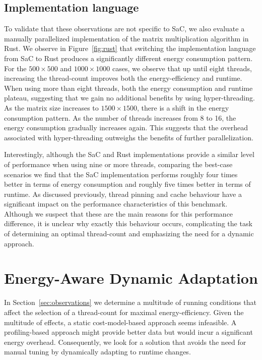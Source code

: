 \documentclass[runningheads]{llncs}
\begin{document}
\subsection{Implementation language}
To validate that these observations are not specific to SaC, we also evaluate a manually parallelized implementation of the matrix multiplication algorithm in Rust.
We observe in Figure~\ref{fig:rust} that switching the implementation language from SaC to Rust produces a significantly different energy consumption pattern.
For the $500 \times 500$ and $1000 \times 1000$ cases, we observe that up until eight threads, increasing the thread-count improves both the energy-efficiency and runtime.
When using more than eight threads, both the energy consumption and runtime plateau, suggesting that we gain no additional benefits by using hyper-threading.
As the matrix size increases to $1500 \times 1500$, there is a shift in the energy consumption pattern.
As the number of threads increases from 8 to 16, the energy consumption gradually increases again.
This suggests that the overhead associated with hyper-threading outweighs the benefits of further parallelization.

Interestingly, although the SaC and Rust implementations provide a similar level of performance when using nine or more threads, comparing the best-case scenarios we find that the SaC implementation performs roughly four times better in terms of energy consumption and roughly five times better in terms of runtime.
As discussed previously, thread pinning and cache behaviour have a significant impact on the performance characteristics of this benchmark.
Although we suspect that these are the main reasons for this performance difference, it is unclear why exactly this behaviour occurs, complicating the task of determining an optimal thread-count and emphasizing the need for a dynamic approach.

\section{Energy-Aware Dynamic Adaptation}\label{sec:implementation}
In Section~\ref{sec:observations} we determine a multitude of running conditions that affect the selection of a thread-count for maximal energy-efficiency.
Given the multitude of effects, a static cost-model-based approach seems infeasible.
A profiling-based approach might provide better data but would incur a significant energy overhead.
Consequently, we look for a solution that avoids the need for manual tuning by dynamically adapting to runtime changes.
\end{document}
